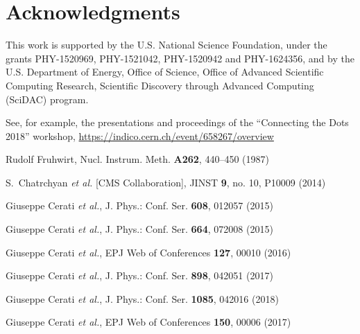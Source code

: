 \documentclass{webofc}
\def\etal{\emph{et al.}\xspace}
\begin{document}
\section{Acknowledgments}

This work is supported by the U.S. National Science Foundation, under the
grants PHY-1520969, PHY-1521042, PHY-1520942 and PHY-1624356,
and by the U.S. Department of Energy, Office of
Science, Office of Advanced Scientific Computing Research, Scientific
Discovery through Advanced Computing (SciDAC) program.


\begin{thebibliography}{}

 See, for example, the presentations and proceedings of the ``Connecting the Dots 2018'' workshop, \url{https://indico.cern.ch/event/658267/overview}

 Rudolf Fruhwirt, Nucl. Instrum. Meth. \textbf{A262}, 440--450 (1987)

 S.~Chatrchyan {\it et al.} [CMS Collaboration],
  JINST {\bf 9}, no. 10, P10009 (2014)

 Giuseppe Cerati \etal, J. Phys.: Conf. Ser. \textbf{608}, 012057 (2015)

 Giuseppe Cerati \etal, J. Phys.: Conf. Ser. \textbf{664}, 072008 (2015)

 Giuseppe Cerati \etal, EPJ Web of Conferences \textbf{127}, 00010 (2016)

 Giuseppe Cerati \etal, J. Phys.: Conf. Ser. \textbf{898}, 042051 (2017)

 Giuseppe Cerati \etal, J. Phys.: Conf. Ser. \textbf{1085}, 042016 (2018)

 Giuseppe Cerati \etal, EPJ Web of Conferences \textbf{150}, 00006 (2017)

  


\end{thebibliography}
\end{document}
